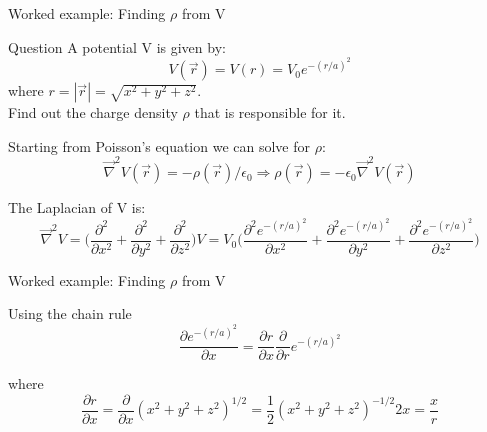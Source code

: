 %
%

{
\problemslide

%
%
%

\begin{frame}{Worked example: Finding $\rho$ from V}

\begin{blockexmplque}{Question}
  A potential V is given by:
  \begin{equation*}
     V(\vec{r}) = V(r) = V_{0} e^{-(r/a)^2}
  \end{equation*}
  where $r = |\vec{r}| = \sqrt{x^2+y^2+z^2}$.\\
  Find out the charge density $\rho$ that is responsible for it.
\end{blockexmplque}

\vspace{0.1cm}

Starting from  Poisson's equation we can solve for $\rho$:
\begin{equation*}
  \vec{\nabla}^{2}V(\vec{r}) = -\rho(\vec{r})/\epsilon_0 \Rightarrow
  \rho(\vec{r}) = - \epsilon_0 \vec{\nabla}^{2}V(\vec{r})
\end{equation*}

\vspace{0.1cm}

The Laplacian of V is:
\begin{equation*}
   \vec{\nabla}^{2}V =
     \Big( \frac{\partial^2}{\partial x^2} +
           \frac{\partial^2}{\partial y^2} +
           \frac{\partial^2}{\partial z^2}
     \Big) V =
     V_0
     \Big(
      \frac{\partial^2 e^{-(r/a)^2}}{\partial x^2} +
      \frac{\partial^2 e^{-(r/a)^2}}{\partial y^2} +
      \frac{\partial^2 e^{-(r/a)^2}}{\partial z^2}
     \Big)
\end{equation*}

\end{frame}

%
%
%

\begin{frame}{Worked example: Finding $\rho$ from V}

Using the chain rule
\begin{equation*}
   \frac{\partial e^{-(r/a)^2}}{\partial x} =
          \frac{\partial r}{\partial x} \frac{\partial}{\partial r} e^{-(r/a)^2}
\end{equation*}

where
\begin{equation*}
   \frac{\partial r}{\partial x} = \frac{\partial}{\partial x} (x^2+y^2+z^2)^{1/2} =
      \frac{1}{2} (x^2+y^2+z^2)^{-1/2} 2x = \frac{x}{r}
\end{equation*}


\end{frame}}

